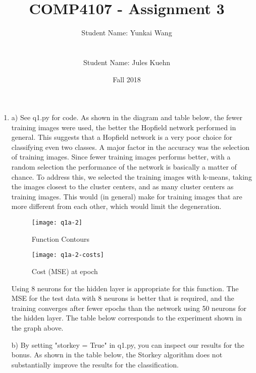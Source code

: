 \documentclass[11pt]{article}
\title{COMP4107 - Assignment 3}
\author{Student Name: Yunkai Wang\\
\text{Student Number: 100968473}\\\\
Student Name: Jules Kuehn\\
\text{Student Number: 100661464}}
\date{Fall 2018}
\begin{document}
\maketitle
\begin{enumerate}

\item
a) See q1.py for code.\newline
\newline
As shown in the diagram and table below, the fewer training images were used, the better the Hopfield network performed in general. This suggests that a Hopfield network is a very poor choice for classifying even two classes.\newline
A major factor in the accuracy was the selection of training images. Since fewer training images performs better, with a random selection the performance of the network is basically a matter of chance. To address this, we selected the training images with k-means, taking the images closest to the cluster centers, and as many cluster centers as training images. This would (in general) make for training images that are more different from each other, which would limit the degeneration.
\begin{figure}[h!]
    \centering
    \begin{minipage}{0.45\textwidth}
        \centering
        \texttt{[image: q1a-2]} %
        \caption{Function Contours}
    \end{minipage}\hfill
    \begin{minipage}{0.45\textwidth}
        \centering
        \texttt{[image: q1a-2-costs]} %
        \caption{Cost (MSE) at epoch}
    \end{minipage}
\end{figure}\newline
Using 8 neurons for the hidden layer is appropriate for this function. The MSE for the test data with 8 neurons is better that is required, and the training converges after fewer epochs than the network using 50 neurons for the hidden layer.\newline
The table below corresponds to the experiment shown in the graph above.\newline



b) By setting "storkey = True" in q1.py, you can inspect our results for the bonus.\newline
\newline
As shown in the table below, the Storkey algorithm does not substantially improve the results for the classification.


\end{enumerate}
\end{document}
